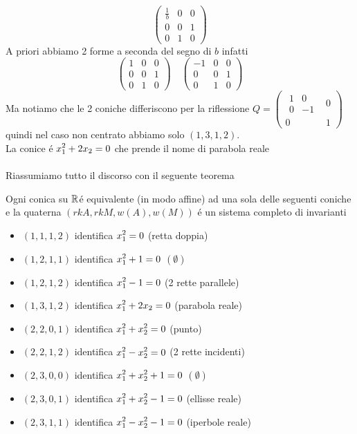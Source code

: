 $$ \left( \begin{array}{cc|c}
\frac{1}{b} & 0 & 0 \\ 0 & 0 & 1 \\ \hline 0 & 1 &0
\end{array} \right)$$
A priori abbiamo 2 forme a seconda del segno di $b$ infatti
$$ \left( \begin{array}{cc|c}
1 & 0 & 0 \\ 0 & 0 & 1 \\ \hline 0 & 1 &0
\end{array} \right) \quad  \left( \begin{array}{cc|c}
-1 & 0 & 0 \\ 0 & 0 & 1 \\ \hline 0 & 1 &0
\end{array} \right)$$
Ma notiamo che le 2 coniche differiscono per la riflessione $ Q = \left( \begin{array}{c|c} \begin{array}{cc}1 & 0 \\ 0 & -1 
\end{array}& 0 \\ \hline 0 & 1 

\end{array} \right)$ quindi nel caso non centrato abbiamo solo $( 1,3,1,2)$.\\
La conice \'e $\ds x_1^2 +2x_2=0$ che prende il nome di parabola reale\\
\\
\spazio
Riassumiamo tutto il discorso con il seguente teorema
\begin{thm}\bianco
Ogni conica su $\R$\'e equivalente (in modo affine) ad una sola delle seguenti coniche e la quaterna $(rk A , rk M , w(A), w(M))$ \'e un sistema completo di invarianti
\begin{itemize}
\item $(1,1,1,2)$ identifica $\ds x_1^2=0$ (retta doppia)
\item $(1,2,1,1)$ identifica $\ds x_1^2 +1 =0 $ $ (\emptyset)$
\item $(1,2,1,2)$ identifica $\ds x_1^2-1=0$ (2 rette parallele)
\item $(1,3,1,2)$ identifica $\ds x_1^2 + 2 x_2=0$ (parabola reale)
\item $(2,2,0,1)$ identifica $\ds x_1^2 + x_2^2=0$ (punto)
\item $(2,2,1,2)$ identifica $\ds x_1^2 - x_2^2 =0$ (2 rette incidenti)
\item $(2,3,0,0)$ identifica $\ds x_1^2 + x_2^2 +1 =0$ $(\emptyset)$
\item $(2,3,0,1)$ identifica $\ds x_1^2 +x_2^2 -1=0$ (ellisse reale)
\item $(2,3,1,1)$ identifica $\ds x_1^2-x_2^2-1=0$ (iperbole reale)
\end{itemize}
\end{thm}
\newpage

